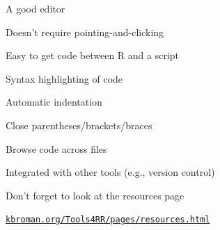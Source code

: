 \documentclass[12pt,t]{beamer}
\begin{document}
\begin{frame}{A good editor}

\vspace{24pt}

\bi
\itemsep12pt
\item Doesn't require pointing-and-clicking
\item Easy to get code between R and a script
\item Syntax highlighting of code
\item Automatic indentation
\item Close parentheses/brackets/braces
\item Browse code across files
\item Integrated with other tools (e.g., version control)
\ei

\end{frame}


\begin{frame}[c]{Don't forget to look at the resources page}


\centerline{\href{http://kbroman.org/Tools4RR/pages/resources.html}{\tt kbroman.org/Tools4RR/pages/resources.html}}

\end{frame}
\end{document}
